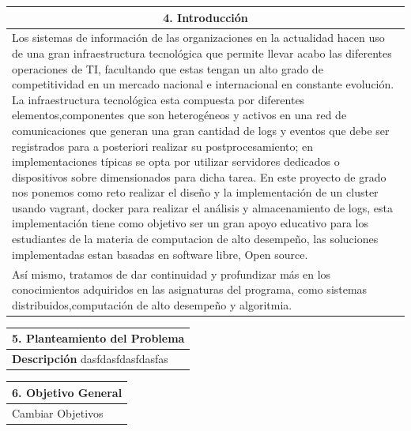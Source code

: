 \documentclass[letter,12pt]{article}
\begin{document}
\begin{center}
\begin{tabular}{|p{15.5cm}|}
\hline
\multicolumn{1}{|c|}{ \textbf{4. Introducción} }\\
\hline
Los sistemas de información de las organizaciones en la actualidad hacen uso de
una gran infraestructura tecnológica que permite llevar acabo las diferentes
operaciones de TI, facultando que estas tengan un alto grado de competitividad en
un mercado nacional e internacional en constante evolución. La infraestructura 
tecnológica esta compuesta por diferentes elementos,componentes que son
heterogéneos y activos en una red de comunicaciones que generan una gran cantidad
de logs y eventos que debe ser registrados para a posteriori realizar su postprocesamiento;
en implementaciones típicas se opta por utilizar servidores 
dedicados o dispositivos sobre dimensionados para dicha tarea. En este proyecto de grado nos
ponemos como reto realizar el diseño y la implementación de un cluster usando vagrant, docker para realizar el análisis y almacenamiento de logs, esta implementación tiene como objetivo ser un gran apoyo educativo para los estudiantes de la materia de computacion de alto desempeño, las soluciones implementadas estan basadas en software libre, Open source.\\ Así mismo, tratamos de dar continuidad y profundizar más en los conocimientos adquiridos en las asignaturas del programa, como sistemas distribuidos,computación de alto desempeño y algoritmia.\\
\hline
\end{tabular}
\end{center}
\begin{center}
\begin{tabular}{|p{15.5cm}|}
\hline
\multicolumn{1}{|c|}{ \textbf{5. Planteamiento del Problema} }\\
\hline
\textbf{Descripción}
dasfdasfdasfdasfas\\
\hline
\end{tabular}
\end{center}

\begin{center}
\begin{tabular}{|p{15.5cm}|}
\hline
\multicolumn{1}{|c|}{ \textbf{6. Objetivo General}}\\
\hline
Cambiar Objetivos\\
\hline
\end{tabular}
\end{center}
\end{document}
